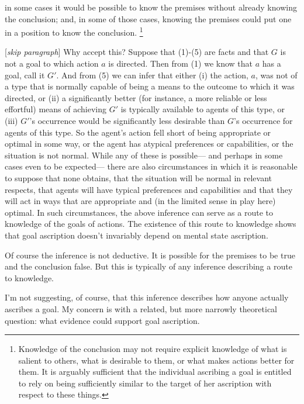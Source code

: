 \documentclass[12pt,\papersize]{extarticle}
\begin{document}
in some cases
it would be possible to know the premises without already knowing the conclusion;
and, 
in some of those cases,
knowing the premises could put one in a position to know the conclusion.%
\footnote{
Knowledge of the conclusion may not require explicit knowledge of 
	what is salient to others,
	what is desirable to them,
	or what makes actions better for them.
It is arguably sufficient that
the individual ascribing a goal 
is entitled to 
rely on being sufficiently similar to the target of her ascription 
with respect to 
these things.
}

[\textit{skip paragraph}]
Why accept this?
Suppose that 
	(1)-(5) are facts 
and that
	$G$ is not a goal to which action $a$ is directed.
Then from (1) we know that $a$ has a goal, call it $G'$.
And from (5) we can infer that either 
(i) 
the action, $a$, was not of a type that is normally capable 
of being a means to the outcome to which it was directed,
or
(ii) 
a significantly better (for instance, a more reliable or less effortful) means of achieving $G'$ is typically available to agents of this type,
or
(iii)
$G'$'s occurrence would be significantly less desirable than $G$'s occurrence for agents of this type.
So the agent's action fell short of being appropriate or optimal in some way,
or the agent has atypical preferences or capabilities,
or the situation is not normal.
While any of these is possible---%
and perhaps in some cases even to be expected---%
there are also circumstances in which it is reasonable to suppose that none obtains,
that the situation will be normal in relevant respects,
that agents will have typical preferences and capabilities 
and that they will act in ways that are appropriate and (in the limited sense in play here) optimal.
In such circumstances, the above inference can serve as a route to knowledge of the goals of actions.
The existence of this route to knowledge shows that goal ascription doesn't invariably depend on mental state ascription.

Of course the inference is not deductive.  It is possible for the premises to be true and the conclusion false.  But this is typically of any inference describing a route to knowledge.

I'm not suggesting, of course, that this inference describes how anyone actually ascribes a goal.
My concern is with a related, but more narrowly theoretical question: what evidence could support goal ascription.
\end{document}
